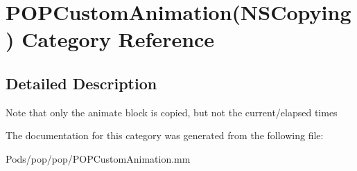 \hypertarget{category_p_o_p_custom_animation_07_n_s_copying_08}{}\section{P\+O\+P\+Custom\+Animation(N\+S\+Copying) Category Reference}
\label{category_p_o_p_custom_animation_07_n_s_copying_08}


\subsection{Detailed Description}
Note that only the animate block is copied, but not the current/elapsed times 

The documentation for this category was generated from the following file\+:\begin{DoxyCompactItemize}
\item 
Pods/pop/pop/P\+O\+P\+Custom\+Animation.\+mm\end{DoxyCompactItemize}
